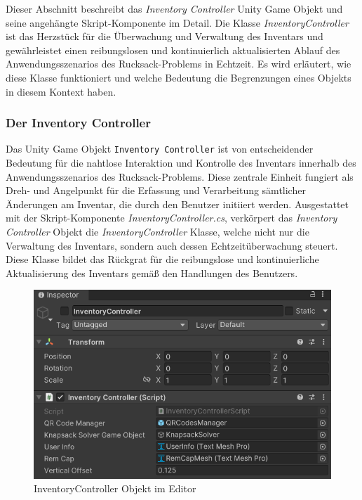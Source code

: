 Dieser Abschnitt beschreibt das \textit{Inventory Controller} Unity Game Objekt und seine angehängte Skript-Komponente
im Detail. Die Klasse \textit{InventoryController} ist das Herzstück für die Überwachung und Verwaltung des Inventars
und gewährleistet einen reibungslosen und kontinuierlich aktualisierten Ablauf des Anwendungsszenarios des Rucksack-Problems
in Echtzeit. Es wird erläutert, wie diese Klasse funktioniert und welche Bedeutung die Begrenzungen eines Objekts in
diesem Kontext haben.

\subsubsection{Der Inventory Controller}
Das Unity Game Objekt \texttt{Inventory Controller} ist von entscheidender Bedeutung für die nahtlose Interaktion und
Kontrolle des Inventars innerhalb des Anwendungsszenarios des Rucksack-Problems. Diese zentrale Einheit fungiert als Dreh-
und Angelpunkt für die Erfassung und Verarbeitung sämtlicher Änderungen am Inventar, die durch den Benutzer initiiert
werden. Ausgestattet mit der Skript-Komponente \textit{InventoryController.cs}, verkörpert das \textit{Inventory Controller}
Objekt die \textit{InventoryController} Klasse, welche nicht nur die Verwaltung des Inventars, sondern auch dessen
Echtzeitüberwachung steuert. Diese Klasse bildet das Rückgrat für die reibungslose und kontinuierliche Aktualisierung
des Inventars gemäß den Handlungen des Benutzers.

\begin{figure}[H]
    \centering
    \includegraphics[scale=0.7]{images/invCon_Editor}
    \caption{InventoryController Objekt im Editor}
    \label{fig:InventoryController_Editor}
\end{figure}

